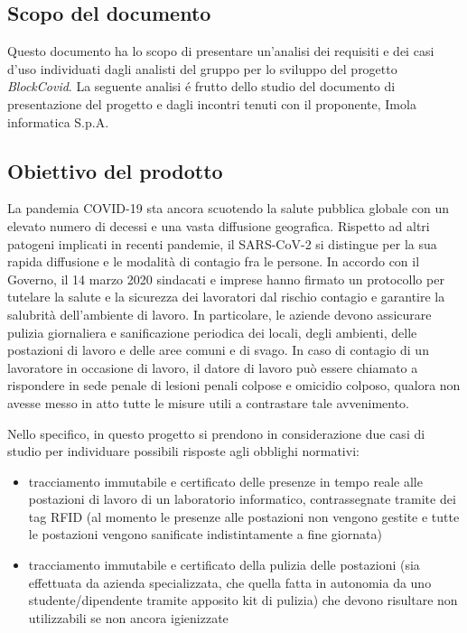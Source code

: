 \subsection{Scopo del documento}
Questo documento ha lo scopo di presentare un'analisi dei requisiti e dei casi d'uso individuati dagli analisti del gruppo \Gruppo{} per lo sviluppo del progetto \emph{BlockCovid}. La seguente analisi \'{e} frutto dello studio del documento di presentazione del progetto e dagli incontri tenuti con il proponente, Imola informatica S.p.A.

\subsection{Obiettivo del prodotto}
La pandemia COVID-19 sta ancora scuotendo la salute pubblica globale con un elevato numero di decessi e
una vasta diffusione geografica. Rispetto ad altri patogeni implicati in recenti pandemie, il SARS-CoV-2 si
distingue per la sua rapida diffusione e le modalità di contagio fra le persone.
In accordo con il Governo, il 14 marzo 2020 sindacati e imprese hanno firmato un protocollo per tutelare la
salute e la sicurezza dei lavoratori dal rischio contagio e garantire la salubrità dell’ambiente di lavoro. In
particolare, le aziende devono assicurare pulizia giornaliera e sanificazione periodica dei locali, degli
ambienti, delle postazioni di lavoro e delle aree comuni e di svago. In caso di contagio di un lavoratore in
occasione di lavoro, il datore di lavoro può essere chiamato a rispondere in sede penale di lesioni penali
colpose e omicidio colposo, qualora non avesse messo in atto tutte le misure utili a contrastare tale
avvenimento.

Nello specifico, in questo progetto si prendono in considerazione due casi di studio per individuare possibili
risposte agli obblighi normativi:
\begin{itemize}
    \item tracciamento immutabile e certificato delle presenze in tempo reale alle postazioni di lavoro di un
    laboratorio informatico, contrassegnate tramite dei tag RFID (al momento le presenze alle postazioni
    non vengono gestite e tutte le postazioni vengono sanificate indistintamente a fine giornata)
    \item tracciamento immutabile e certificato della pulizia delle postazioni (sia effettuata da azienda
    specializzata, che quella fatta in autonomia da uno studente/dipendente tramite apposito kit di
    pulizia) che devono risultare non utilizzabili se non ancora igienizzate
\end{itemize}

